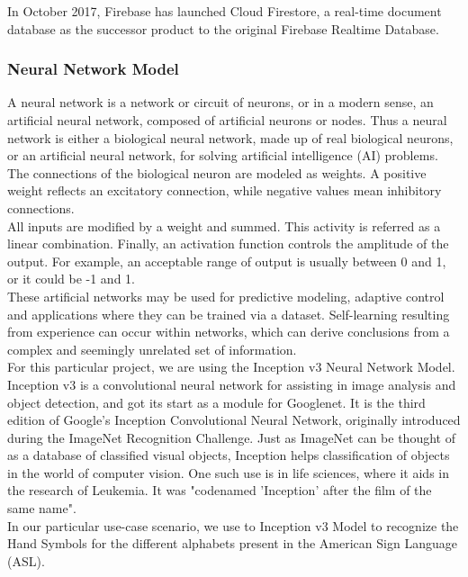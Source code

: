 \documentclass[14pt]{report}
\begin{document}
					In October 2017, Firebase has launched Cloud Firestore, a real-time document database as the successor product to the original Firebase Realtime Database.
				\subsubsection{Neural Network Model}

					A neural network is a network or circuit of neurons, or in a modern sense, an artificial neural network, composed of artificial neurons or nodes. Thus a neural network is either a biological neural network, made up of real biological neurons, or an artificial neural network, for solving artificial intelligence (AI) problems. The connections of the biological neuron are modeled as weights. A positive weight reflects an excitatory connection, while negative values mean inhibitory connections.\\
					 
					All inputs are modified by a weight and summed. This activity is referred as a linear combination. Finally, an activation function controls the amplitude of the output. For example, an acceptable range of output is usually between 0 and 1, or it could be -1 and 1.\\

					These artificial networks may be used for predictive modeling, adaptive control and applications where they can be trained via a dataset. Self-learning resulting from experience can occur within networks, which can derive conclusions from a complex and seemingly unrelated set of information.\\

					For this particular project, we are using the Inception v3 Neural Network Model. Inception v3 is a convolutional neural network for assisting in image analysis and object detection, and got its start as a module for Googlenet. It is the third edition of Google's Inception Convolutional Neural Network, originally introduced during the ImageNet Recognition Challenge. Just as ImageNet can be thought of as a database of classified visual objects, Inception helps classification of objects in the world of computer vision. One such use is in life sciences, where it aids in the research of Leukemia. It was "codenamed 'Inception' after the film of the same name".\\

					In our particular use-case scenario, we use to Inception v3 Model to recognize the Hand Symbols for the different alphabets present in the American Sign Language (ASL).
\end{document}
